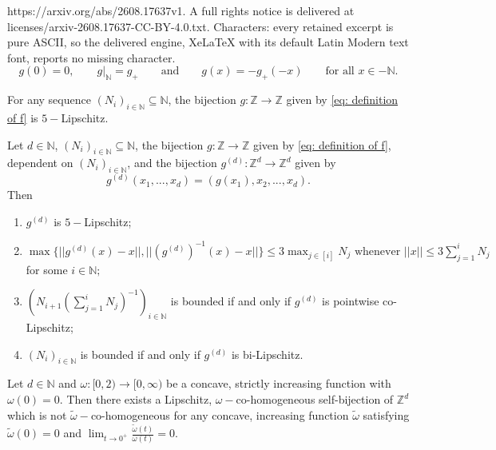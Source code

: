 \documentclass[10pt,a4paper]{amsart}
\newcommand{\N}{\mathbb{N}}
\newcommand{\Z}{\mathbb{Z}}
\begin{document}
https://arxiv.org/abs/2608.17637v1. A full rights notice is delivered at licenses/arxiv-2608.17637-CC-BY-4.0.txt. Characters: every retained excerpt is pure ASCII, so the delivered engine, XeLaTeX with its default Latin Modern text font, reports no missing character.
\begin{equation}\label{eq: definition of f}
    g(0) = 0, \qquad g|_{\N} = g_+ \qquad \text{and} \qquad g(x) = -g_+(-x) \qquad \text{for all $x \in -\N$}.
\end{equation}

\begin{lemma} \label{lemma: 5-lipschitz}
    For any sequence $(N_i)_{i \in \N} \subseteq \N$, the bijection $g:\Z \to \Z$ given by \eqref{eq: definition of f} is $5-$Lipschitz.
\end{lemma}

\begin{lemma} \label{lemma: bilipschitz properties}
    Let $d \in \N$, $(N_i)_{i \in \N} \subseteq \N$, the bijection $g:\Z \to \Z$ given by \eqref{eq: definition of f}, dependent on $(N_i)_{i \in \N}$, and the bijection $g^{(d)}:\Z^d \to \Z^d$ given by
    \begin{equation*} \label{eq: fd}
     g^{(d)}(x_1,...,x_d) = (g(x_1),x_2,...,x_d).
 \end{equation*}
    Then
    \begin{enumerate}
    \item $g^{(d)}$ is $5-$Lipschitz;
    \item \label{enumerate: gd} $\max\{||g^{(d)}(x)-x||,||(g^{(d)})^{-1}(x)-x||\} \leq 3\max_{j \in [i]}N_j \text{ whenever $||x|| \leq 3\sum_{j=1}^iN_j$}$ for some $i \in \N;$
        \item \label{point 3, lemma 4.9} $\left(N_{i+1}(\sum_{j=1}^{i}N_j)^{-1}\right)_{i \in \N}$ is bounded if and only if $g^{(d)}$ is pointwise co-Lipschitz;
        \item \label{point 4} $(N_i)_{i \in \N}$ is bounded if and only if $g^{(d)}$ is bi-Lipschitz.
    \end{enumerate}
\end{lemma}

\begin{lemma} \label{lemma: cohom examples}
Let $d \in \N$ and $\omega:[0,2) \to [0,\infty)$ be a concave, strictly increasing function with $\omega(0) = 0$. Then there exists a Lipschitz, $\omega-$co-homogeneous self-bijection of $\Z^d$ which is not $\widetilde{\omega}-$co-homogeneous for any concave, increasing function $\widetilde{\omega}$ satisfying $\widetilde{\omega}(0)=0$ and $\lim_{t \to 0^{+}}\tfrac{\widetilde{\omega}(t)}{\omega(t)}=0$. 
\end{lemma}
\end{document}
